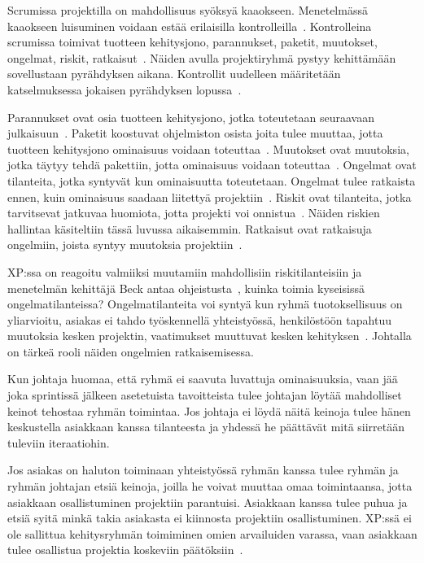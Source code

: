 \documentclass[finnish]{tktltiki2}
\theoremstyle{definition}
\theoremstyle{remark}
\begin{document}
Scrumissa projektilla on mahdollisuus syöksyä kaaokseen. Menetelmässä kaaokseen luisuminen voidaan estää erilaisilla kontrolleilla~\cite{schwaber1995scrum}. Kontrolleina scrumissa toimivat tuotteen kehitysjono, parannukset, paketit, muutokset, ongelmat, riskit, ratkaisut~\cite{schwaber1995scrum}. Näiden avulla projektiryhmä pystyy kehittämään sovellustaan pyrähdyksen aikana. Kontrollit uudelleen määritetään katselmuksessa jokaisen pyrähdyksen lopussa~\cite{schwaber1995scrum}.

Parannukset ovat osia tuotteen kehitysjono, jotka toteutetaan seuraavaan julkaisuun~\cite{schwaber1995scrum}. Paketit koostuvat ohjelmiston osista joita tulee muuttaa, jotta tuotteen kehitysjono ominaisuus voidaan toteuttaa~\cite{schwaber1995scrum}. Muutokset ovat muutoksia, jotka täytyy tehdä pakettiin, jotta ominaisuus voidaan toteuttaa~\cite{schwaber1995scrum}. Ongelmat ovat tilanteita, jotka syntyvät kun ominaisuutta toteutetaan. Ongelmat tulee ratkaista ennen, kuin ominaisuus saadaan liitettyä projektiin~\cite{schwaber1995scrum}. Riskit ovat tilanteita, jotka tarvitsevat jatkuvaa huomiota, jotta projekti voi onnistua~\cite{schwaber1995scrum}. Näiden riskien hallintaa käsiteltiin tässä luvussa aikaisemmin. Ratkaisut ovat ratkaisuja ongelmiin, joista syntyy muutoksia projektiin~\cite{schwaber1995scrum}.

XP:ssa on reagoitu valmiiksi muutamiin mahdollisiin riskitilanteisiin ja menetelmän kehittäjä Beck antaa ohjeistusta~\cite{796139}, kuinka toimia kyseisissä ongelmatilanteissa? Ongelmatilanteita voi syntyä kun ryhmä tuotoksellisuus on yliarvioitu, asiakas ei tahdo työskennellä yhteistyössä, henkilöstöön tapahtuu muutoksia kesken projektin, vaatimukset muuttuvat kesken kehityksen~\cite{796139}. Johtalla on tärkeä rooli näiden ongelmien ratkaisemisessa.

Kun johtaja huomaa, että ryhmä ei saavuta luvattuja ominaisuuksia, vaan jää joka sprintissä jälkeen asetetuista tavoitteista tulee johtajan löytää mahdolliset keinot tehostaa ryhmän toimintaa. Jos johtaja ei löydä näitä keinoja tulee hänen keskustella asiakkaan kanssa tilanteesta ja yhdessä he päättävät mitä siirretään tuleviin iteraatiohin. 

Jos asiakas on haluton toiminaan yhteistyössä ryhmän kanssa tulee ryhmän ja ryhmän johtajan etsiä keinoja, joilla he voivat muuttaa omaa toimintaansa, jotta asiakkaan osallistuminen projektiin parantuisi. Asiakkaan kanssa tulee puhua ja etsiä syitä minkä takia asiakasta ei kiinnosta projektiin osallistuminen. XP:ssä ei ole sallittua kehitysryhmän toimiminen omien arvailuiden varassa, vaan asiakkaan tulee osallistua projektia koskeviin päätöksiin~\cite{796139}.
\end{document}

